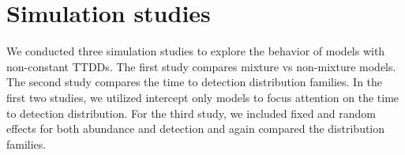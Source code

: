 \documentclass[useAMS,usenatbib,referee,12pt]{article}
\begin{document}
\section{Simulation studies}

We conducted three simulation studies to explore the behavior of models with non-constant TTDDs.
The first study compares mixture vs non-mixture models.
The second study compares the time to detection distribution families.
In the first two studies, we utilized intercept only models to focus attention on the time to detection distribution. 
For the third study, we included fixed and random effects for both abundance and detection and again compared the distribution families. 



% 
\end{document}
